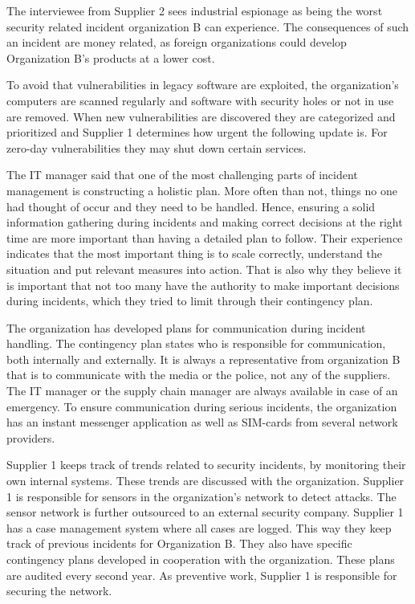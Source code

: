 \documentclass[b5paper, twoside, openright, 11pt]{report}
\begin{document}
The interviewee from Supplier 2 sees industrial espionage as being the worst security related incident organization B can experience. %
The consequences of such an incident are money related, as foreign organizations could develop Organization B's products at a lower cost. 

To avoid that vulnerabilities in legacy software are exploited, the organization's computers are scanned regularly and software with security holes or not in use are removed. When new vulnerabilities are discovered they are categorized and prioritized and Supplier 1 determines how urgent the following update is. For zero-day vulnerabilities they may shut down certain services.

The \acs{IT} manager said that one of the most challenging parts of incident management is constructing a holistic plan. More often than not, things no one had thought of occur and they need to be handled. Hence, ensuring a solid information gathering during incidents and making correct decisions at the right time are more important than having a detailed plan to follow. Their experience indicates that the most important thing is to scale correctly, understand the situation and put relevant measures into action. That is also why they believe it is important that not too many have the authority to make important decisions during incidents, which they tried to limit through their contingency plan.

The organization has developed plans for communication during incident handling. The contingency plan states who is responsible for communication, both internally and externally. It is always a representative from organization B that is to communicate with the media or the police, not any of the suppliers. The IT manager or the supply chain manager are always available in case of an emergency. To ensure communication during serious incidents, the organization has an instant messenger application as well as SIM-cards from several network providers. 

Supplier 1 keeps track of trends related to security incidents, by monitoring their own internal systems. These trends are discussed with the organization. Supplier 1 is responsible for sensors in the organization's network to detect attacks. The sensor network is further outsourced to an external security company. Supplier 1 has a case management system where all cases are logged. This way they keep track of previous incidents for Organization B. They also have specific contingency plans developed in cooperation with the organization. These plans are audited every second year. As preventive work, Supplier 1 is responsible for securing the network.
\end{document}
